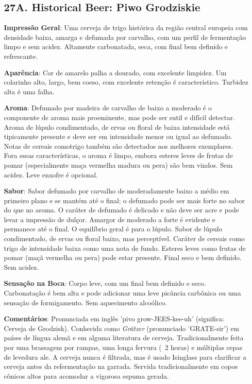 \subsection*{27A. Historical Beer: Piwo Grodziskie}

\textbf{Impressão Geral}: Uma cerveja de trigo histórica da região central europeia com densidade baixa, amarga e defumada por carvalho, com um perfil de fermentação limpo e sem acidez. Altamente carbonatada, seca, com final bem definido e refrescante.

\textbf{Aparência}: Cor de amarelo palha a dourado, com excelente limpidez. Um colarinho alto, largo, bem coeso, com excelente retenção é característico. Turbidez alta é uma falha.

\textbf{Aroma}: Defumado por madeira de carvalho de baixo a moderado é o componente de aroma mais proeminente, mas pode ser sutil e difícil detectar. Aroma de lúpulo condimentado, de ervas ou floral de baixa intensidade está tipicamente presente e deve ser em intensidade menor ou igual ao defumado. Notas de cereais comotrigo também são detectados nos melhores exemplares. Fora essas características, o aroma é limpo, embora esteres leves de frutas de pomar (especialmente maça vermelha madura ou pera) são bem vindos. Sem acidez. Leve enxofre é opcional.

\textbf{Sabor}: Sabor defumado por carvalho de moderadamente baixo a médio em primeiro plano e se mantém até o final; o defumado pode ser mais forte no sabor do que no aroma. O caráter de defumado é delicado e não deve ser acre e pode levar a impressão de dulçor. Amargor de moderado a forte é evidente
e permanece até o final. O equilíbrio geral é para o lúpulo. Sabor de lúpulo condimentado, de ervas ou floral baixo, mas perceptível. Caráter de cereais como trigo de intensidade baixa como uma nota de fundo. Esteres leves como frutas de pomar (maçã vermelha ou pera) pode estar presente. Final seco e bem definido. Sem acidez.

\textbf{Sensação na Boca}: Corpo leve, com um final bem definido e seco. Carbonatação é bem alta e pode adicionar uma leve picância carbônica ou uma sensação de formigamento. Sem aquecimento alcoólico.

\textbf{Comentários}: Pronunciada em inglês 'pivo grow-JEES-kee-uh' (significa: Cerveja de Grodzisk). Conhecida como \textit{Grätzer} (pronunciado 'GRATE-sir') em países de língua alemã e em alguma literatura de cerveja. Tradicionalmente feita por uma brassagem por rampas, uma longa fervura (~2 horas) e múltiplas cepas de levedura ale. A cerveja nunca é filtrada, mas é usado Isinglass para clarificar a cerveja antes da refermentação na garrada. Servida tradicionalmente em copos cônicos altos para acomodar a vigorosa espuma gerada.

